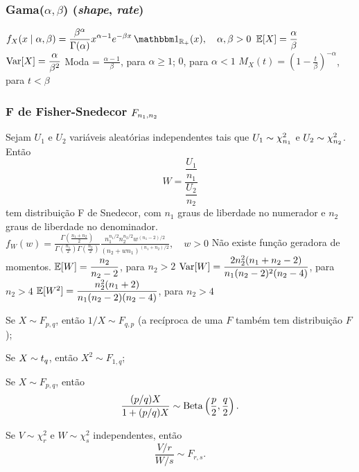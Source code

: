 \subsubsection{Gama($\alpha, \beta$) (\textit{shape}, \textit{rate})}
\begin{outline}
	\1 \(\displaystyle f_X(x \mid \alpha, \beta) = \frac{\beta^\alpha}{\Gamma(\alpha)} x^{\alpha-1}e^{-\beta x}\ind_{\Re_+}(x), \quad \alpha,\beta>0 \)
	\1 \(\displaystyle \operatorname{\mathbb{E}}[X] = \frac{\alpha}{\beta} \)
	\1 \(\displaystyle \operatorname{Var}[X] = \frac{\alpha}{\beta^2} \)
	\1 Moda = $\frac{\alpha-1}{\beta}$, para $\alpha \geq 1$; $0$, para $\alpha<1$
	\1 \(\displaystyle M_X(t) = \left(1-\frac{t}{\beta}\right)^{-\alpha} \), para  $t<\beta$
\end{outline}

\subsubsection{F de Fisher-Snedecor $F_{n_1,n_2}$}

\begin{outline}
	\1 Sejam $U_1$ e $U_2$ variáveis aleatórias independentes tais que $U_1\sim\chi^2_{n_1}$ e $U_2\sim\chi^2_{n_2}$. Então
	\begin{equation}
		W = \frac{\dfrac{U_1}{n_1}}{\dfrac{U_2}{n_2}}
	\end{equation}
	tem distribuição F de Snedecor, com $n_1$ graus de liberdade no numerador e $n_2$ graus de liberdade no denominador.
	\1 \(\displaystyle f_W(w) = \frac{\Gamma\left(\frac{n_1+n_2}{2}\right)}{\Gamma\left(\frac{n_1}{2}\right)\Gamma\left(\frac{n_2}{2}\right)}\frac{n_1^{n_1/2}n_2^{n_2/2}w^{(n_1-2)/2}}{(n_2+wn_1)^{(n_1+n_2)/2}}, \quad w>0\)
	\1 Não existe função geradora de momentos.
	\1 $\operatorname{\mathbb{E}}[W] = \dfrac{n_2}{n_2-2}$, para $n_2>2$
	\1 $\operatorname{Var}[W] = \dfrac{2n_2^2(n_1+n_2-2)}{n_1(n_2-2)^2(n_2-4)}$, para $n_2>4$
	\1 $\operatorname{\mathbb{E}}[W^2] = \dfrac{n_2^2(n_1+2)}{n_1(n_2-2)(n_2-4)}$, para $n_2>4$
\end{outline}

\begin{theorem}
	\leavevmode
	\begin{outline}[enumerate]
		\1 Se $X \sim F_{p,q}$, então $1/X \sim F_{q,p}$ (a recíproca de uma $F$ também tem distribuição $F$);
		
		\1 Se $X \sim t_{q}$, então $X^2 \sim F_{1,q}$;
		
		\1 Se $X \sim F_{p,q}$, então
		\[
		\frac{(p/q)X}{1 + (p/q)X} \sim \operatorname{Beta}\left(\frac{p}{2}, \frac{q}{2}\right).
		\]
		
		\1 Se $V \sim \chi_r^2$ e $W \sim \chi_s^2$ independentes, então
		\[
		\frac{V/r}{W/s} \sim F_{r,s}.
		\]
	\end{outline}
\end{theorem}


